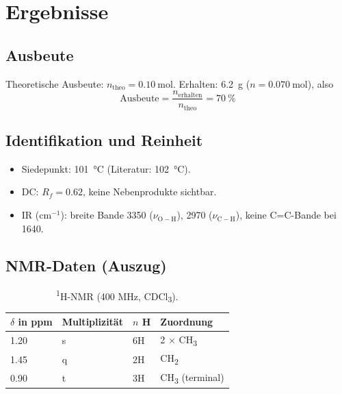 \section{Ergebnisse}
\label{sec:ergebnisse}

\subsection{Ausbeute}
Theoretische Ausbeute: $n_{\text{theo}} = \SI{0.10}{\mol}$.
Erhalten: \SI{6.2}{\gram} ($n = \SI{0.070}{\mol}$), also
\begin{equation}
  \text{Ausbeute} = \frac{n_{\text{erhalten}}}{n_{\text{theo}}} = \SI{70}{\percent}
  \label{eq:ausbeute}
\end{equation}

\subsection{Identifikation und Reinheit}
\begin{itemize}
  \item Siedepunkt: \SI{101}{\celsius} (Literatur: \SI{102}{\celsius}).
  \item DC: $R_f = 0.62$, keine Nebenprodukte sichtbar.
  \item IR (cm$^{-1}$): breite Bande 3350 ($\nu_{\mathrm{O-H}}$),
        2970 ($\nu_{\mathrm{C-H}}$), keine C=C-Bande bei 1640.
\end{itemize}

\subsection{NMR-Daten (Auszug)}
\begin{table}[H]
  \centering
  \caption{\textsuperscript{1}H-NMR (400 MHz, CDCl\textsubscript{3}).}
  \label{tab:nmr}
  \begin{tabular}{llll}
    \toprule
    $\delta$ in \si{ppm} & Multiplizität & $n$ H & Zuordnung \\
    \midrule
    1.20 & s & 6H & 2 $\times$ CH\textsubscript{3} \\
    1.45 & q & 2H & CH\textsubscript{2} \\
    0.90 & t & 3H & CH\textsubscript{3} (terminal) \\
    \bottomrule
  \end{tabular}
\end{table}
